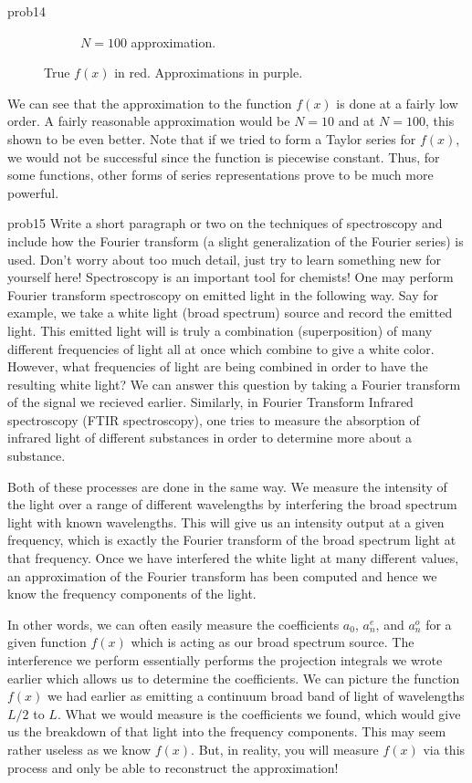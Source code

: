 \documentclass{article}
\begin{document}
\begin{solution}{}{prob14}
\begin{figure}[H]
\begin{subfigure}[h]{0.3\textwidth}
		\caption{$N=100$ approximation.}
	\end{subfigure}
\caption{True $f(x)$ in red. Approximations in purple.}
\end{figure}
We can see that the approximation to the function $f(x)$ is done at a fairly low order. A fairly reasonable approximation would be $N=10$ and at $N=100$, this shown to be even better.  Note that if we tried to form a Taylor series for $f(x)$, we would not be successful since the function is piecewise constant.  Thus, for some functions, other forms of series representations prove to be much more powerful.
	\end{solution}

\begin{solution}{}{prob15}
		Write a short paragraph or two on the techniques of spectroscopy and include how the Fourier transform (a slight generalization of the Fourier series) is used. Don't worry about too much detail, just try to learn something new for yourself here! Spectroscopy is an important tool for chemists!
		\tcblower
		One may perform Fourier transform spectroscopy on emitted light in the following way. Say for example, we take a white light (broad spectrum) source and record the emitted light. This emitted light will is truly a combination (superposition) of many different frequencies of light all at once which combine to give a white color.  However, what frequencies of light are being combined in order to have the resulting white light? We can answer this question by taking a Fourier transform of the signal we recieved earlier. Similarly, in Fourier Transform Infrared spectroscopy (FTIR spectroscopy), one tries to measure the absorption of infrared light of different substances in order to determine more about a substance.
		
		Both of these processes are done in the same way.  We measure the intensity of the light over a range of different wavelengths by interfering the broad spectrum light with known wavelengths. This will give us an intensity output at a given frequency, which is exactly the Fourier transform of the broad spectrum light at that frequency.  Once we have interfered the white light at many different values, an approximation of the Fourier transform has been computed and hence we know the frequency components of the light.
		
		In other words, we can often easily measure the coefficients $a_0$, $a_n^e$, and $a_n^o$ for a given function $f(x)$ which is acting as our broad spectrum source.  The interference we perform essentially performs the projection integrals we wrote earlier which allows us to determine the coefficients.  We can picture the function $f(x)$ we had earlier as emitting a continuum broad band of light of wavelengths $L/2$ to $L$. What we would measure is the coefficients we found, which would give us the breakdown of that light into the frequency components. This may seem rather useless as we know $f(x)$. But, in reality, you will measure $f(x)$ via this process and only be able to reconstruct the approximation!
	\end{solution}
\end{document}
